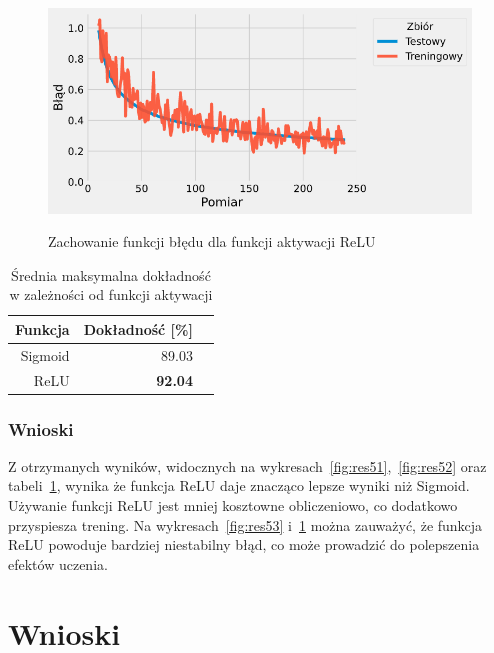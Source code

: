 \documentclass{article}
\begin{document}
\begin{figure}[H]
	\centering
	\caption{Zachowanie funkcji błędu dla funkcji aktywacji ReLU}
	\includegraphics[width=\textwidth]{activation_err_relu.png}
	\label{fig:res54}
\end{figure}

\begin{table}[H]
	\caption{Średnia maksymalna dokładność w zależności od funkcji aktywacji}
	\label{tabela-res-51}
	\centering
	\begin{tabular}{rrr}
		\toprule
		Funkcja & Dokładność [\%] \\
		\midrule
		Sigmoid & 89.03              \\
		ReLU    & \textbf{92.04}     \\
		\bottomrule
	\end{tabular}
\end{table}

\subsubsection*{Wnioski}

Z otrzymanych wyników, widocznych na wykresach~\ref{fig:res51},~\ref{fig:res52} oraz tabeli~\ref{tabela-res-51}, wynika że funkcja ReLU daje znacząco lepsze wyniki niż Sigmoid. Używanie funkcji ReLU jest mniej kosztowne obliczeniowo, co dodatkowo przyspiesza trening. Na wykresach~\ref{fig:res53} i~\ref{fig:res54} można zauważyć, że funkcja ReLU powoduje bardziej niestabilny błąd, co może prowadzić do polepszenia efektów uczenia.

\newpage
\section{Wnioski}
\end{document}
